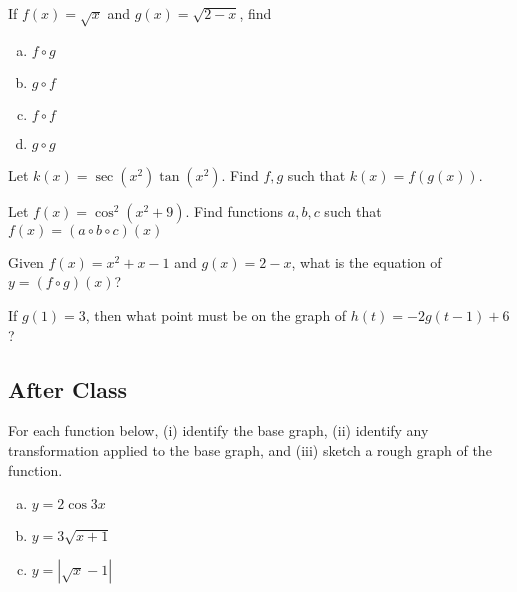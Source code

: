 \documentclass[notes]{subfiles}
\begin{document}
		\begin{ex}
			If $f(x) = \sqrt{x}$ and $g(x) = \sqrt{2-x}$, find 
				\begin{enumerate}[(a)]
					\item $f\circ g$
						
					\item $g\circ f$
						
					\item $f\circ f$
						
					\item $g\circ g$
				\end{enumerate}
		\end{ex}
			\newpage
			
		\begin{ex}
			Let $k(x) = \sec(x^2)\tan(x^2)$.  Find $f,g$ such that $k(x) = f(g(x))$.
		\end{ex}
			\vs{1}
			
		\begin{ex}
			Let $f(x) = \cos^2 (x^2 + 9)$.  Find functions $a,b,c$ such that $f(x) = (a\circ b\circ c)(x)$
		\end{ex}
			\vs{1}
		
		\begin{ex}
			Given $f(x) = x^2 + x -1$ and $g(x) = 2-x$, what is the equation of $y =(f\circ g)(x)$?
		\end{ex}
			\vs{1}
			
		\begin{ex}
			If $g(1) = 3$, then what point must be on the graph of $h(t) = -2g(t-1) + 6$?
		\end{ex}
			\vs{1}
			\newpage
		
	\subsection*{After Class}
		\begin{ex}
			For each function below, (i) identify the base graph, (ii) identify any transformation applied to the base graph, and (iii) sketch a rough graph of the function.
			\begin{enumerate}[(a)]
				\item $y = 2\cos 3x$
					\vs{1}

				\item $y = 3\sqrt{x+1}$
					\vs{1}
					
				\item $y = |\sqrt{x} - 1|$
					\vs{1}
					
			\end{enumerate}
		\end{ex}
			\newpage
			
\end{document}
